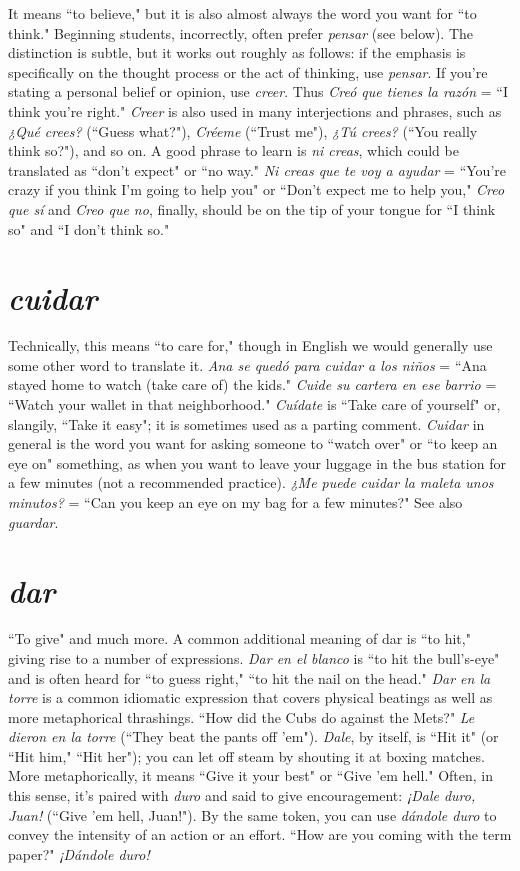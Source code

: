 It means ``to believe," but it is also almost always the word
you want for ``to think." Beginning students, incorrectly, often prefer
\emph{pensar} (see below). The distinction is subtle, but it works out roughly
as follows: if the emphasis is specifically on the thought process or the
act of thinking, use \emph{pensar}. If you're stating a personal belief or opinion, use \emph{creer}. Thus \emph{Creó que tienes la razón} = ``I think you're right."
\emph{Creer} is also used in many interjections and phrases, such as \emph{¿Qué
crees?} (``Guess what?"), \emph{Créeme} (``Trust me"), \emph{¿Tú crees?} (``You really
think so?"), and so on. A good phrase to learn is \emph{ni creas}, which could
be translated as ``don't expect" or ``no way." \emph{Ni creas que te voy a ayudar} = ``You're crazy if you think I'm going to help you" or ``Don't expect me to help you," \emph{Creo que sí} and \emph{Creo que no}, finally, should be
on the tip of your tongue for ``I think so" and ``I don't think so."

\section{\emph{cuidar}}

Technically, this means ``to care for," though in English we
would generally use some other word to translate it. \emph{Ana se quedó
para cuidar a los niños} = ``Ana stayed home to watch (take care of)
the kids." \emph{Cuide su cartera en ese barrio} = ``Watch your wallet in that
neighborhood." \emph{Cuídate} is ``Take care of yourself" or, slangily, ``Take it
easy"; it is sometimes used as a parting comment. \emph{Cuidar} in general is
the word you want for asking someone to ``watch over" or ``to keep an
eye on" something, as when you want to leave your luggage in the bus
station for a few minutes (not a recommended practice). \emph{¿Me puede
cuidar la maleta unos minutos?} = ``Can you keep an eye on my bag
for a few minutes?" See also \emph{guardar}.

\section{\emph{dar}}

``To give" and much more. A common additional meaning of
dar is ``to hit," giving rise to a number of expressions. \emph{Dar en el blanco}
is ``to hit the bull's-eye" and is often heard for ``to guess right," ``to hit
the nail on the head." \emph{Dar en la torre} is a common idiomatic expression that covers physical beatings as well as more metaphorical thrashings. ``How did the Cubs do against the Mets?" \emph{Le dieron en la torre}
(``They beat the pants off 'em"). \emph{Dale}, by itself, is ``Hit it" (or ``Hit
him," ``Hit her"); you can let off steam by shouting it at boxing matches.
More metaphorically, it means ``Give it your best" or ``Give 'em hell."
Often, in this sense, it's paired with \emph{duro} and said to give encouragement: \emph{¡Dale duro, Juan!} (``Give 'em hell, Juan!"). By the same token,
you can use \emph{dándole duro} to convey the intensity of an action or an
effort. ``How are you coming with the term paper?" \emph{¡Dándole duro!}

